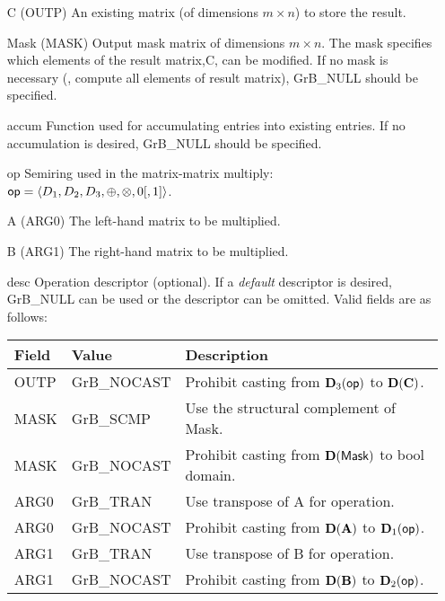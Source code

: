 \begin{itemize}[leftmargin=1.1in]
    \item[{\sf C}]    ({\sf OUTP}) An existing matrix (of dimensions $m \times n$) to store the result. 

    \item[{\sf Mask}] ({\sf MASK}) Output mask matrix of dimensions $m \times n$. 
    The mask specifies which elements of the result matrix,{\sf C}, can be modified. 
    If no mask is necessary (\ie, compute all elements of result
    matrix), {\sf GrB\_NULL} should be specified.

    \item[{\sf accum}]  Function used for accumulating entries into existing
     entries. If no accumulation is desired,
    {\sf GrB\_NULL} should be specified.

    \item[{\sf op}]   Semiring used in the matrix-matrix multiply: ${\sf op}=\langle D_1,D_2,D_3,\oplus,\otimes,0 [,1] \rangle$.
    \item[{\sf A}]    ({\sf ARG0}) The left-hand matrix to be multiplied.  
    \item[{\sf B}]    ({\sf ARG1}) The right-hand matrix to be multiplied. 

    \item[{\sf desc}]  Operation descriptor (optional). If a
    \emph{default} descriptor is desired, {\sf GrB\_NULL} can be
    used or the descriptor can be omitted. Valid fields are as follows: \\
    \begin{tabular}{lll}
    Field  & Value & Description \\
    \hline
    {\sf OUTP} & {\sf GrB\_NOCAST} & Prohibit casting from $\bold{D}_3({\sf op})$ to $\bold{D}({\bf C})$.\\
    {\sf MASK} & {\sf GrB\_SCMP} & Use the structural complement of {\sf Mask}. \\
    {\sf MASK} & {\sf GrB\_NOCAST} & Prohibit casting from $\bold{D}({\sf Mask})$ to {\sf bool} domain. \\
    {\sf ARG0} & {\sf GrB\_TRAN} & Use transpose of {\sf A} for operation. \\
    {\sf ARG0} & {\sf GrB\_NOCAST} & Prohibit casting from $\bold{D}({\bf A})$ to $\bold{D}_1({\sf op})$. \\
    {\sf ARG1} & {\sf GrB\_TRAN} & Use transpose of {\sf B} for operation. \\
    {\sf ARG1} & {\sf GrB\_NOCAST} & Prohibit casting from $\bold{D}({\bf B})$ to $\bold{D}_2({\sf op})$. \\
    \end{tabular}
\end{itemize}

